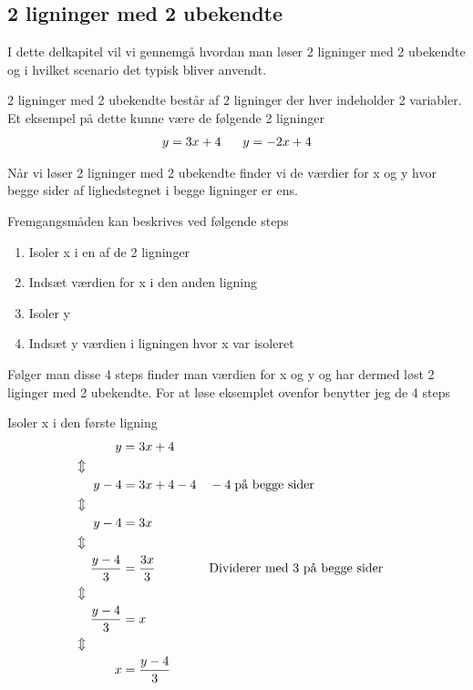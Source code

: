 \subsection{2 ligninger med 2 ubekendte}

I dette delkapitel vil vi gennemgå hvordan man løser 2 ligninger med 2 ubekendte og i hvilket scenario det typisk bliver anvendt.

2 ligninger med 2 ubekendte består af 2 ligninger der hver indeholder 2 variabler. Et eksempel på dette kunne være de følgende 2 ligninger
\begin{align*}
    y = 3x + 4 \hspace{6mm} y = -2x + 4
\end{align*}

Når vi løser 2 ligninger med 2 ubekendte finder vi de værdier for x og y hvor begge sider af lighedstegnet i begge ligninger er ens.

Fremgangsmåden kan beskrives ved følgende steps

\begin{enumerate}
    \item Isoler x i en af de 2 ligninger
    \item Indsæt værdien for x i den anden ligning
    \item Isoler y 
    \item Indsæt y værdien i ligningen hvor x var isoleret
\end{enumerate}

Følger man disse 4 steps finder man værdien for x og y og har dermed løst 2 liginger med 2 ubekendte. For at løse eksemplet ovenfor benytter jeg de 4 steps

Isoler x i den første ligning
\begin{align*}
    y &= 3x + 4\\
    \Updownarrow \hspace{1cm}&\\
    y - 4 &= 3x + 4 - 4 && -4 \hspace{1mm} \text{på begge sider}\\
    \Updownarrow \hspace{1cm}&\\
    y - 4 &= 3x\\
    \Updownarrow \hspace{1cm}&\\
    \frac{y - 4}{3} &= \frac{3x}{3} && \text{Dividerer med 3 på begge sider}\\
    \Updownarrow \hspace{1cm}&\\
    \frac{y - 4}{3} &= x\\
    \Updownarrow \hspace{1cm}&\\
    x &= \frac{y - 4}{3}
\end{align*}

